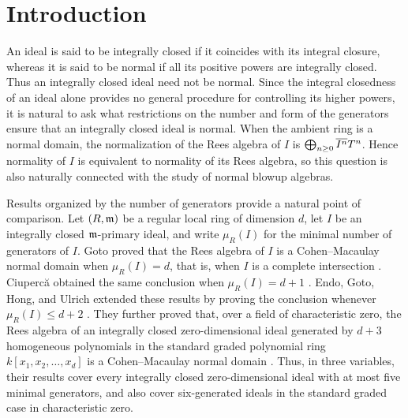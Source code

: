 \section{Introduction}
\label{sec:introduction}

An ideal is said to be integrally closed if it coincides with its integral
closure, whereas it is said to be normal if all its positive powers are
integrally closed.  Thus an integrally closed ideal need not be normal.  Since
the integral closedness of an ideal alone provides no general procedure for
controlling its higher powers, it is natural to ask what restrictions on the
number and form of the generators ensure that an integrally closed ideal
is normal.  When the ambient ring is a normal domain, the normalization of the
Rees algebra of $I$ is $\bigoplus_{n\geq0}\overline{I^n}T^n$.  Hence normality of
$I$ is equivalent to normality of its Rees algebra, so this question is also
naturally connected with the study of normal blowup algebras.

Results organized by the number of generators provide a natural point of
comparison.  Let $(R,\mathfrak m)$ be a regular local ring of dimension $d$, let
$I$ be an integrally closed $\mathfrak m$-primary ideal, and write $\mu_R(I)$ for the
minimal number of generators of $I$.  Goto \cite{Goto1987} proved that the Rees
algebra of $I$ is a Cohen--Macaulay normal domain when $\mu_R(I)=d$, that is,
when $I$ is a complete intersection
\cite[Corollary~1.3]{Goto1987}.  Ciuperc\u{a} \cite{Ciuperca2006} obtained the same conclusion when
$\mu_R(I)=d+1$
\cite[Theorem~1.1]{Ciuperca2006}.  Endo, Goto, Hong, and Ulrich \cite{EndoGotoHongUlrich2026} extended these
results by proving the conclusion whenever $\mu_R(I)\leq d+2$
\cite[Theorem~2.2 and Corollary~2.4]{EndoGotoHongUlrich2026}.  They further proved that, over a field of characteristic zero, the Rees algebra of an
integrally closed zero-dimensional ideal generated by $d+3$ homogeneous
polynomials in the standard graded polynomial ring $k[x_1,x_2,\ldots,x_d]$ is a
Cohen--Macaulay normal domain
\cite[Theorem~3.4]{EndoGotoHongUlrich2026}.  Thus, in three variables, their
results cover every integrally closed zero-dimensional ideal with at most five
minimal generators, and also cover six-generated ideals in the standard
graded case in characteristic zero.

